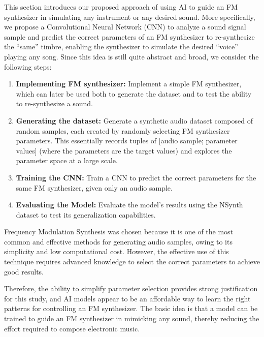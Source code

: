 \documentclass[10pt,conference]{IEEEtran}
\begin{document}
This section introduces our proposed approach of using AI to guide an FM synthesizer in simulating any instrument or any desired sound. More specifically, we propose a Convolutional Neural Network (CNN) to analyze a sound signal sample and predict the correct parameters of an FM synthesizer to re-synthesize the ``same'' timbre, enabling the synthesizer to simulate the desired ``voice'' playing any song. Since this idea is still quite abstract and broad, we consider the following steps:

\begin{enumerate}
    \item \textbf{Implementing FM synthesizer:} Implement a simple FM synthesizer, which can later be used both to generate the dataset and to test the ability to re-synthesize a sound.
    \item \textbf{Generating the dataset:} Generate a synthetic audio dataset composed of random samples, each created by randomly selecting FM synthesizer parameters. This essentially records tuples of [audio sample; parameter values] (where the parameters are the target values) and explores the parameter space at a large scale.
    \item \textbf{Training the CNN:} Train a CNN to predict the correct parameters for the same FM synthesizer, given only an audio sample.
    \item \textbf{Evaluating the Model:} Evaluate the model's results using the NSynth dataset to test its generalization capabilities.
\end{enumerate}

Frequency Modulation Synthesis was chosen because it is one of the most common and effective methods for generating audio samples, owing to its simplicity and low computational cost. However, the effective use of this technique requires advanced knowledge to select the correct parameters to achieve good results.


Therefore, the ability to simplify parameter selection provides strong justification for this study, and AI models appear to be an affordable way to learn the right patterns for controlling an FM synthesizer. The basic idea is that a model can be trained to guide an FM synthesizer in mimicking any sound, thereby reducing the effort required to compose electronic music.
\end{document}
